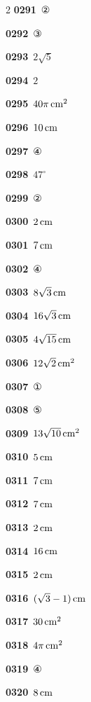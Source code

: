 \documentclass[10pt,a4paper]{article}
\begin{document}
\begin{multicols}{2}
\noindent\textbf{0291}\ ②\par
\noindent\textbf{0292}\ ③\par
\noindent\textbf{0293}\ $2\sqrt{5}$\par
\noindent\textbf{0294}\ $2$\par
\noindent\textbf{0295}\ $40\pi\mkern3mu \mathrm{cm}^2$\par
\noindent\textbf{0296}\ $10\mkern3mu \mathrm{cm}$\par
\noindent\textbf{0297}\ ④\par
\noindent\textbf{0298}\ $47^\circ$\par
\noindent\textbf{0299}\ ②\par
\noindent\textbf{0300}\ $2\mkern3mu \mathrm{cm}$\par
\noindent\textbf{0301}\ $7\mkern3mu \mathrm{cm}$\par
\noindent\textbf{0302}\ ④\par
\noindent\textbf{0303}\ $8\sqrt{3}\mkern3mu \mathrm{cm}$\par
\noindent\textbf{0304}\ $16\sqrt{3}\mkern3mu \mathrm{cm}$\par
\noindent\textbf{0305}\ $4\sqrt{15}\mkern3mu \mathrm{cm}$\par
\noindent\textbf{0306}\ $12\sqrt{2}\mkern3mu \mathrm{cm}^2$\par
\noindent\textbf{0307}\ ①\par
\noindent\textbf{0308}\ ⑤\par
\noindent\textbf{0309}\ $13\sqrt{10}\mkern3mu \mathrm{cm}^2$\par
\noindent\textbf{0310}\ $5\mkern3mu \mathrm{cm}$\par
\noindent\textbf{0311}\ $7\mkern3mu \mathrm{cm}$\par
\noindent\textbf{0312}\ $7\mkern3mu \mathrm{cm}$\par
\noindent\textbf{0313}\ $2\mkern3mu \mathrm{cm}$\par
\noindent\textbf{0314}\ $16\mkern3mu \mathrm{cm}$\par
\noindent\textbf{0315}\ $2\mkern3mu \mathrm{cm}$\par
\noindent\textbf{0316}\ $(\sqrt{3}-1)\mkern3mu \mathrm{cm}$\par
\noindent\textbf{0317}\ $30\mkern3mu \mathrm{cm}^2$\par
\noindent\textbf{0318}\ $4\pi\mkern3mu \mathrm{cm}^2$\par
\noindent\textbf{0319}\ ④\par
\noindent\textbf{0320}\ $8\mkern3mu \mathrm{cm}$\par

\end{multicols}
\end{document}
